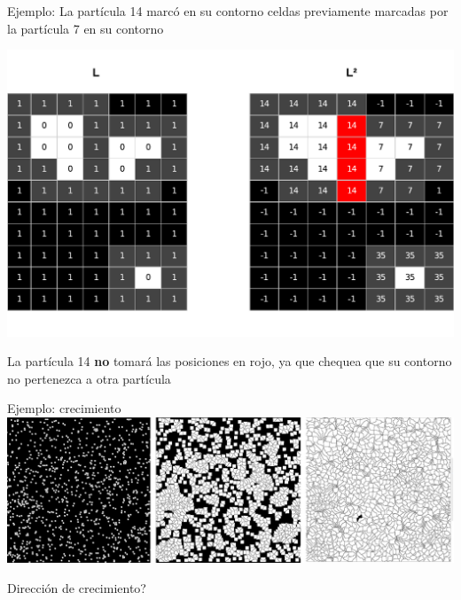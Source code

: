 \documentclass[spanish,unknownkeysallowed,10pt]{beamer}
\begin{document}
\begin{frame}
Ejemplo: La partícula 14 marcó en su contorno celdas previamente marcadas por la partícula 7 en su contorno
\centerline{\includegraphics[scale = 0.35]{../figures/sistemaparticulas}}
La partícula 14 \textbf{no} tomará las posiciones en rojo, ya que chequea que su contorno no pertenezca a otra partícula
\end{frame}

\begin{frame}{Ejemplo: crecimiento}
\includegraphics[scale = 0.15]{../figures/modeladocrec}

\centering
Dirección de crecimiento?
\end{frame}
\end{document}
